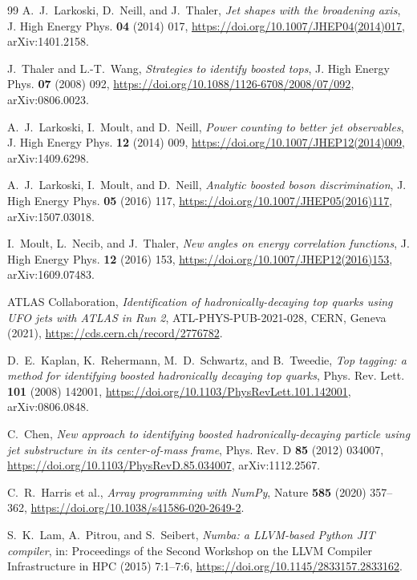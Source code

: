 \documentclass[pdflatex,sn-mathphys,Numbered,iicol]{sn-jnl}
\begin{document}
\begin{thebibliography}{99}
A.~J.~Larkoski, D.~Neill, and J.~Thaler,
\emph{Jet shapes with the broadening axis},
J. High Energy Phys. \textbf{04} (2014) 017,
\url{https://doi.org/10.1007/JHEP04(2014)017},
arXiv:1401.2158.

J.~Thaler and L.-T.~Wang,
\emph{Strategies to identify boosted tops},
J. High Energy Phys. \textbf{07} (2008) 092,
\url{https://doi.org/10.1088/1126-6708/2008/07/092},
arXiv:0806.0023.

A.~J.~Larkoski, I.~Moult, and D.~Neill,
\emph{Power counting to better jet observables},
J. High Energy Phys. \textbf{12} (2014) 009,
\url{https://doi.org/10.1007/JHEP12(2014)009},
arXiv:1409.6298.

A.~J.~Larkoski, I.~Moult, and D.~Neill,
\emph{Analytic boosted boson discrimination},
J. High Energy Phys. \textbf{05} (2016) 117,
\url{https://doi.org/10.1007/JHEP05(2016)117},
arXiv:1507.03018.

I.~Moult, L.~Necib, and J.~Thaler,
\emph{New angles on energy correlation functions},
J. High Energy Phys. \textbf{12} (2016) 153,
\url{https://doi.org/10.1007/JHEP12(2016)153},
arXiv:1609.07483.

ATLAS Collaboration,
\emph{Identification of hadronically-decaying top quarks using UFO jets with ATLAS in
Run 2},
ATL-PHYS-PUB-2021-028, CERN, Geneva (2021),
\url{https://cds.cern.ch/record/2776782}.

D.~E.~Kaplan, K.~Rehermann, M.~D.~Schwartz, and B.~Tweedie,
\emph{Top tagging: a method for identifying boosted hadronically decaying top quarks},
Phys. Rev. Lett. \textbf{101} (2008) 142001,
\url{https://doi.org/10.1103/PhysRevLett.101.142001},
arXiv:0806.0848.

C.~Chen,
\emph{New approach to identifying boosted hadronically-decaying particle using jet
substructure in its center-of-mass frame},
Phys. Rev. D \textbf{85} (2012) 034007,
\url{https://doi.org/10.1103/PhysRevD.85.034007},
arXiv:1112.2567.

C.~R.~Harris et al.,
\emph{Array programming with NumPy},
Nature \textbf{585} (2020) 357--362,
\url{https://doi.org/10.1038/s41586-020-2649-2}.

S.~K.~Lam, A.~Pitrou, and S.~Seibert,
\emph{Numba: a LLVM-based Python JIT compiler},
in: Proceedings of the Second Workshop on the LLVM Compiler Infrastructure in HPC
(2015) 7:1--7:6,
\url{https://doi.org/10.1145/2833157.2833162}.


\end{thebibliography}
\end{document}
